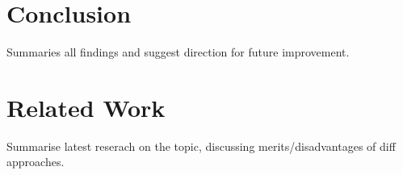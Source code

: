 \documentclass[conference]{IEEEtran}
\begin{document}








\section{Conclusion} \label{s-concl}

Summaries all findings and suggest direction for future improvement.\\

\section{Related Work} \label{s-rel-work}

Summarise latest reserach on the topic, discussing merits/disadvantages of diff approaches.\\




\end{document}
